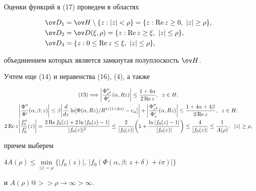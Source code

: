 \begin{pf}
Оценки функций в (17)  проведем в областях 


\begin{align*} 


\ov D_1&=\ov H\setminus\{z:|z|<\rho\}= 


\{z:\re z\ge 0,\ |z|\ge\rho\},\\ 


\ov D_2&=\ov D(\xi,\rho)=\{z:\re z\ge\xi,\ |z|\le\rho\},\\ 


\ov D_3&=\{z:0\le\re z\le\xi,\ |z|\le\rho\}, 


\end{align*} 


объединением которых является замкнутая полуплоскость $\ov H$. 


Учтем еще (14) и неравенства (16), (4), а также


\begin{gather*} 


(13) \Longrightarrow\bigg|\frac{\Phi''_{z^2}}{\Phi'_z} 


(\alpha,R z)\bigg|\le\frac{1+4\alpha}{2\re z},\ \; z\in H;\\ 


%


\bigg|\frac{\Phi''}{\Phi'}(\alpha,\beta;z)\bigg|\le 


\beta\bigg|\frac{d}{dz}\ln[\Phi(\alpha,R z)/ 


R^{1/(1+2\alpha)}-c_\alpha]\bigg|+\bigg| 


\frac{\Phi''_{z^2}}{\Phi'_z}(\alpha,R z)\bigg|\le 


\frac{1+4\alpha+4\beta}{2\re z},\ \; z\in H;\\ 


%


2\re z\bigg|\frac{f''_0}{f'_0}(z)\bigg|= 


\frac{2\re f_0(z)+2\ln|f_0(z)-1|}{|f_0(z)|^2}\le 


\frac{2}{|f_0(z)|}\bigg(1+ 


\frac{\ln|f_0(z)-1|}{|f_0(z)|}\bigg)\le 


\frac{4}{|f_0(z)|}\le\frac{1}{A(\rho)},\ \;|z|\ge\rho, 


\end{gather*} 


причем выберем


$4A(\rho)\le\min\limits_{|z|=\rho}\{|f_0(z)|,\ |f_0(\Phi(\alpha,


\beta;\,z+\delta)+i\pi)|\}$


и $A(\rho)@>>{\rho\to\infty}>\infty$. 



\end{pf}
